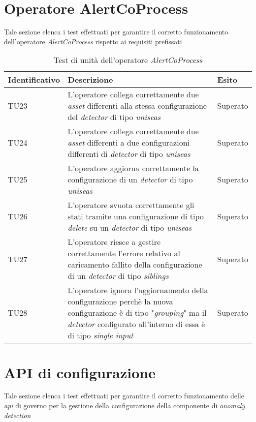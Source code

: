 \section{Operatore AlertCoProcess}
Tale sezione elenca i test effettuati per garantire il corretto funzionamento dell'operatore \textit{AlertCoProcess} rispetto ai requisiti prefissati

{
\centering
\begin{longtable}{L{3cm} L{8.5cm} L{2cm}}
\caption{Test di unità dell'operatore \textit{AlertCoProcess}}\\
\textbf{Identificativo} &
\textbf{Descrizione}&
\textbf{Esito}\\
\endhead
\hline

TU23 & L'operatore collega correttamente due \textit{asset} differenti alla stessa configurazione del \textit{detector} di tipo \textit{uniseas} & Superato\\
\hline
TU24 & L'operatore collega correttamente due \textit{asset} differenti a due configurazioni differenti di \textit{detector} di tipo \textit{uniseas} & Superato \\
\hline
TU25 &  L'operatore aggiorna correttamente la configurazione di un \textit{detector} di tipo \textit{uniseas} & Superato\\
\hline
TU26 & L'operatore svuota correttamente gli stati tramite una configurazione di tipo \textit{delete} su un \textit{detector} di tipo \textit{uniseas} & Superato \\
\hline
TU27 & L'operatore riesce a gestire correttamente l'errore relativo al caricamento fallito della configurazione di un \textit{detector} di tipo \textit{siblings} & Superato\\
\hline
TU28 & L'operatore ignora l'aggiornamento della configurazione perchè la nuova configurazione è di tipo "\textit{grouping}" ma il \textit{detector} configurato all'interno di essa è di tipo \textit{single input} & Superato \\
\hline
\end{longtable}
}

\section{API di configurazione}
Tale sezione elenca i test effettuati per garantire il corretto funzionamento delle \textit{\gls{api}} di governo per la gestione della configurazione della componente di \textit{anomaly detection}

